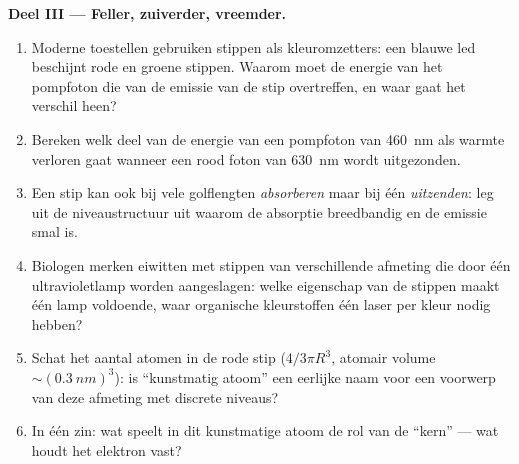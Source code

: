 \begin{problem}
\medskip\noindent\textbf{Deel III --- Feller, zuiverder, vreemder.}
\begin{enumerate}[resume]
  \item Moderne toestellen gebruiken stippen als kleuromzetters: een
        blauwe led beschijnt rode en groene stippen. Waarom moet de
        energie van het pompfoton die van de emissie van de stip
        overtreffen, en waar gaat het verschil heen?
  \item Bereken welk deel van de energie van een pompfoton van
        \qty{460}{nm} als warmte verloren gaat wanneer een rood foton
        van \qty{630}{nm} wordt uitgezonden.
  \item Een stip kan ook bij vele golflengten \emph{absorberen} maar bij
        één \emph{uitzenden}: leg uit de niveaustructuur uit waarom de
        absorptie breedbandig en de emissie smal is.
  \item Biologen merken eiwitten met stippen van verschillende afmeting
        die door één ultravioletlamp worden aangeslagen: welke
        eigenschap van de stippen maakt één lamp voldoende, waar
        organische kleurstoffen één laser per kleur nodig hebben?
  \item Schat het aantal atomen in de rode stip ($4/3\pi R^3$, atomair
        volume $\sim(\qty{0.3}{nm})^3$): is ``kunstmatig atoom'' een
        eerlijke naam voor een voorwerp van deze afmeting met discrete
        niveaus?
  \item In één zin: wat speelt in dit kunstmatige atoom de rol van de
        ``kern'' --- wat houdt het elektron vast?
\end{enumerate}


\end{problem}
